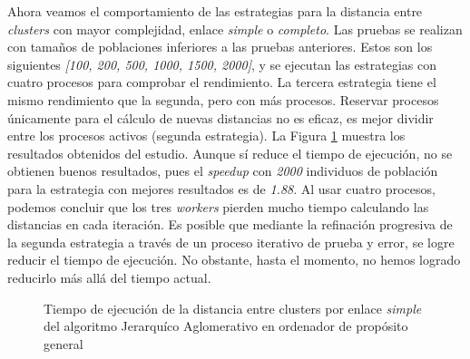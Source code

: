 		Ahora veamos el comportamiento de las estrategias para la distancia entre \textit{clusters} con mayor complejidad, enlace \textit{simple} o \textit{completo}. Las pruebas se realizan con tamaños de poblaciones inferiores a las pruebas anteriores. Estos son los siguientes \textit{[100, 200, 500, 1000, 1500, 2000]}, y se ejecutan las estrategias con cuatro procesos para comprobar el rendimiento. La tercera estrategia tiene el mismo rendimiento que la segunda, pero con más procesos. Reservar procesos únicamente para el cálculo de nuevas distancias no es eficaz, es mejor dividir entre los procesos activos (segunda estrategia). La Figura \ref{fig:JA_simple} muestra los resultados obtenidos del estudio. Aunque sí reduce el tiempo de ejecución, no se obtienen buenos resultados, pues el \textit{speedup} con \textit{2000} individuos de población para la estrategia con mejores resultados es de \textit{1.88}. Al usar cuatro procesos, podemos concluir que los tres \textit{workers} pierden mucho tiempo calculando las distancias en cada iteración. Es posible que mediante la refinación progresiva de la segunda estrategia a través de un proceso iterativo de prueba y error, se logre reducir el tiempo de ejecución. No obstante, hasta el momento, no hemos logrado reducirlo más allá del tiempo actual.
		
			\begin{figure}[!h]
				\hspace{-0.10\textwidth}
				\caption{Tiempo de ejecución de la distancia entre clusters por enlace \textit{simple} del algoritmo Jerarquíco Aglomerativo en ordenador de propósito general}
				\label{fig:JA_simple}
			\end{figure}
				
